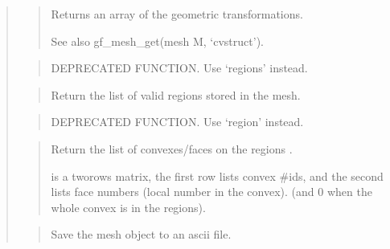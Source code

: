 \documentclass[a4paper,11pt,english]{sphinxmanual}
\begin{document}
\begin{quote}
\sphinxAtStartPar
{}
\begin{quote}

\sphinxAtStartPar
Returns an array of the geometric transformations.

\sphinxAtStartPar
See also gf\_mesh\_get(mesh M, ‘cvstruct’).
\end{quote}

\sphinxAtStartPar
{}
\begin{quote}

\sphinxAtStartPar
DEPRECATED FUNCTION. Use ‘regions’ instead.
\end{quote}

\sphinxAtStartPar
{}
\begin{quote}

\sphinxAtStartPar
Return the list of valid regions stored in the mesh.
\end{quote}

\sphinxAtStartPar
{}
\begin{quote}

\sphinxAtStartPar
DEPRECATED FUNCTION. Use ‘region’ instead.
\end{quote}

\sphinxAtStartPar
{}
\begin{quote}

\sphinxAtStartPar
Return the list of convexes/faces on the regions .

\sphinxAtStartPar
{} is a two\sphinxhyphen{}rows matrix, the first row lists convex \#ids,
and the second lists face numbers (local number in the convex).
(and 0 when the whole convex is in the
regions).
\end{quote}

\sphinxAtStartPar
{}
\begin{quote}

\sphinxAtStartPar
Save the mesh object to an ascii file.


\end{quote}
\end{quote}
\end{document}

